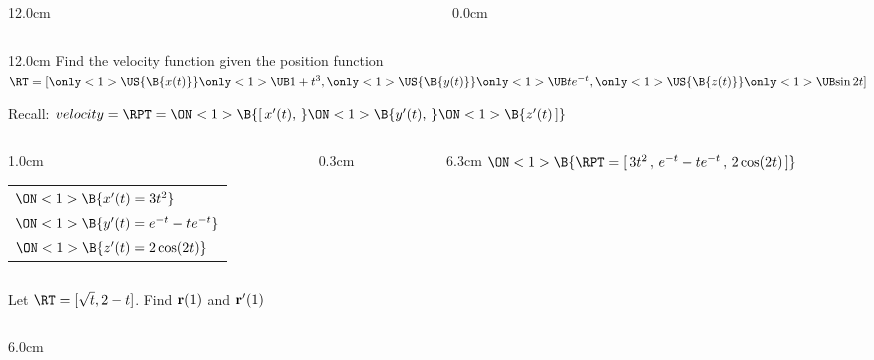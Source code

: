 \begin{frame}
\begin{columns}
\begin{column}{12.0cm}
	\vspace{3.9cm}
	
\end{column}
\begin{column}{0.0cm}\end{column}
\end{columns}
\end{frame}

\begin{frame}
{}
\scriptsize
\begin{columns}
\begin{column}{12.0cm}
\EX Find the velocity function given the position function \quad $\RT = [
\only<1>{\US{\B{ x(t) }}}{
\only<1>{\UB}{ 1+t^3 }}, 
\only<1>{\US{\B{ y(t) }}}{
\only<1>{\UB}{ te^{-t} }}, 
\only<1>{\US{\B{ z(t) }}}{
\only<1>{\UB}{ \sin2t }}]$

\vspace{0.2cm}

Recall: $velocity = \RPT = 
\ON<1>{\B{[ \,x'(t),\,}}
\ON<1>{\B{y'(t),\,}}
\ON<1>{\B{z'(t)\,]}}$
\vspace{0.6cm}

\vspace{0.2cm}
	
	\begin{columns}
	\begin{column}{1.0cm}
		\begin{tabular}{l}
			$\ON<1>{\B{x'(t) = 3t^2}}$ \\
			$\ON<1>{\B{y'(t) = e^{-t} - te^{-t}}}$ \\
			$\ON<1>{\B{z'(t) = 2\cos(2t)}}$
		\end{tabular}
	\end{column}
	\begin{column}{0.3cm}
		\ON<1>{\B{$\D{\implies}$}}
	\end{column}
	\begin{column}{6.3cm}
		$ 
		\ON<1>{\B{\RPT = [\,3t^2\,,\,e^{-t} - te^{-t}\,,\,2\cos(2t)\,]}}$
	\end{column}
	\end{columns}
	
	\vspace{1.0cm}
	
\EX Let $\RT = [\sqrt{t}, 2-t]$.  \quad Find ${\bf r}(1)$ and ${\bf r}'(1)$

\vspace{0.2cm}

\begin{columns}
\begin{column}{6.0cm}
	

\end{column}
\end{columns}
\end{column}
\end{columns}
\end{frame}
